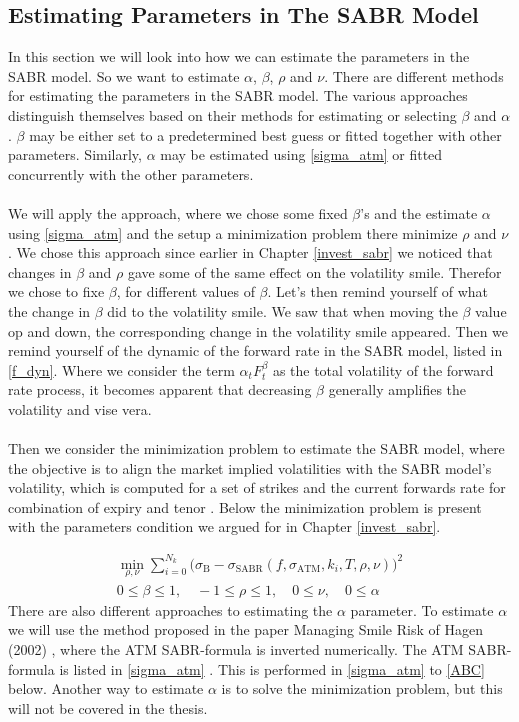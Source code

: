 \subsection{Estimating Parameters in The SABR Model} \label{est_parm_sabr}
In this section we will look into how we can estimate the parameters in the SABR model.
So we want to estimate $\alpha$, $\beta$, $\rho$ and $\nu$.       
There are different methods for estimating the parameters in the SABR model. 
The various approaches distinguish themselves based on their methods for estimating or selecting $\beta$ and $\alpha$.
$\beta$ may be either set to a predetermined best guess or fitted together with other parameters.
Similarly, $\alpha$ may be estimated using \autoref{sigma_atm} or fitted concurrently with the other parameters.
\\\\
We will apply the approach, where we chose some fixed $\beta$'s and the estimate $\alpha$ using \autoref{sigma_atm}  and the
setup a minimization problem there minimize $\rho$ and $\nu$. We chose this approach since earlier in Chapter \ref{invest_sabr}
we noticed that changes in $\beta$ and $\rho$ gave some of the same effect on the volatility smile. Therefor we chose to fixe  $\beta$, for different
values of $\beta$. Let's then remind yourself of what the change in $\beta$ did to the volatility smile.
We saw that when moving the $\beta$ value op and down, the corresponding change in the volatility smile appeared. 
Then we remind yourself of the dynamic of the forward rate in the SABR model, listed in \autoref{f_dyn}. 
Where we consider the term  $\alpha_t F_t^\beta$ as the total volatility of the forward rate process,
it becomes apparent that decreasing $\beta$ generally amplifies the volatility and vise vera. 
\\\\
Then we consider the minimization problem to estimate the SABR model, where the objective is to align
the market implied volatilities with the SABR model's volatility, which is computed for a 
set of strikes and the current forwards rate for combination of expiry and tenor \cite{Lindstrom}. 
Below the minimization problem is present with the parameters condition we argued for in Chapter \ref{invest_sabr}.
 
\begin{align}
   \min_{\rho, \nu} \sum_{i=0}^{N_k} \Big(\sigma_{\text{B}} - 
    \sigma_{\text{SABR}}(f, \sigma_{\text{ATM}}, k_i, T, \rho, \nu)\Big)^2 \\
    0 \leq \beta \leq 1, \quad -1 \leq \rho \leq 1, \quad 0 \leq \nu, \quad 0 \leq \alpha
\end{align}
There are also different approaches to estimating the $\alpha$ parameter.
To estimate $\alpha$ we will use the method proposed in the paper Managing Smile Risk 
of Hagen (2002) \cite{Smile},
where the ATM SABR-formula is inverted numerically. The ATM SABR-formula is listed in \autoref{sigma_atm} \cite{Smile}.
This is performed in \autoref{sigma_atm} to \autoref{ABC} below.
Another way to estimate $\alpha$ is to solve the 
minimization problem, but this will not be covered in the thesis.

